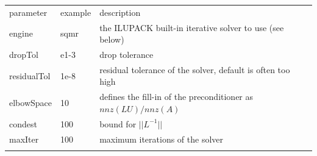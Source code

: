\begin{center}
\begin{tabular}{llp{}}
\hline\noalign{\smallskip}
parameter & example & description \\
\noalign{\smallskip}\hline\noalign{\smallskip}
engine & sqmr & the ILUPACK built-in iterative solver to use (see below)\\
dropTol & e1-3 & drop tolerance\\
residualTol & 1e-8 & residual tolerance of the solver, default is often too high\\
elbowSpace & 10 & defines the fill-in of the preconditioner as $nnz(LU)/nnz(A)$\\
condest & 100 & bound for $||L^{-1}||$ \\
maxIter & 100 & maximum iterations of the solver\\
\noalign{\smallskip}\hline
\end{tabular}
\end{center}


